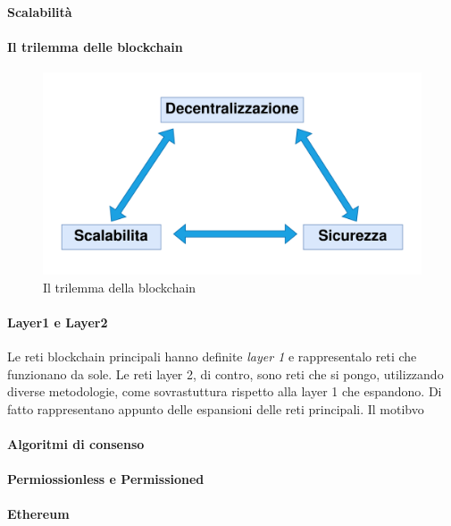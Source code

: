 \documentclass[a4paper,11pt]{article}
\begin{document}
\paragraph{Scalabilità}

\paragraph{Il trilemma delle blockchain}


\begin{figure}[h!]
  \includegraphics[width=1\linewidth]{img/trilemma.png}
  \caption{Il trilemma della blockchain}
  \label{fig:trilemma}
\end{figure}

\paragraph{Layer1 e Layer2}
Le reti blockchain principali hanno definite \textit{layer 1} e rappresentalo reti che funzionano da sole. Le reti layer 2, di contro, sono reti che si pongo, utilizzando diverse metodologie, come sovrastuttura rispetto alla layer 1 che espandono. Di fatto rappresentano appunto delle espansioni delle reti principali. Il motibvo

\paragraph{Algoritmi di consenso}
\paragraph{Permiossionless e Permissioned}
\paragraph{Ethereum}
\end{document}
